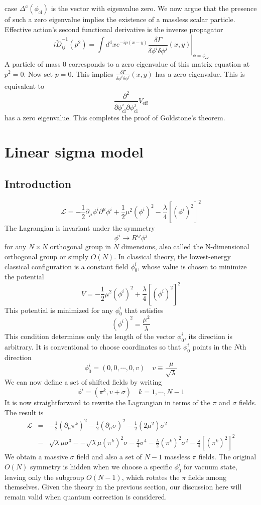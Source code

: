 \documentclass[cyan]{elegantnote}
\begin{document}
\begin{newproof}
case $\Delta^a(\phi_{\mathrm{cl}})$ is the vector with eigenvalue zero.
We now argue that the presence of such a zero eigenvalue implies the existence of a massless scalar particle. Effective action's second functional derivative is the inverse propagator
\[i\tilde{D}_{ij}^{-1}(p^2) = \int d^4x e^{-ip(x-y)} \left. \frac{\delta \Gamma}{\delta \phi^i \delta \phi^j}(x,y) \right|_{\phi = \phi_{\mathcal{cl}}}\]
A particle of mass $0$ corresponds to a zero eigenvalue of this matrix equation at $p^2 = 0$. Now set $p=0$. This implies $\frac{\delta \Gamma}{\delta \phi^i \delta \phi^j}(x,y)$ has a zero eigenvalue. This is equivalent to 
\[\frac{\partial^2}{\partial \phi^i_{\mathrm{cl}} \partial \phi^j_{\mathrm{cl}}}V_{\mathrm{eff}}\]
has a zero eigenvalue. This completes the proof of Goldstone's theorem.
\end{newproof}

\section{Linear sigma model}
\subsection{Introduction}
\[\mathcal{L} = -\frac{1}{2} \partial_{\mu} \phi^i \partial^{\mu}\phi^i + \frac{1}{2} \mu^2 (\phi^i)^2 - \frac{\lambda}{4} [(\phi^i)^2]^2\]
The Lagrangian is invariant under the symmetry
\[\phi^i \to R^{ij} \phi^j\]
for any $N \times N$ orthogonal group in $N$ dimensions, also called the N-dimensional orthogonal group or simply $O(N)$. In classical theory, the lowest-energy classical configuration is a constant field $\phi_0^i$, whose value is chosen to minimize the potential
\[V = -\frac{1}{2}\mu^2 (\phi^i)^2 + \frac{\lambda}{4}[(\phi^i)^2]^2\]
This potential is minimized for any $\phi_0^i$ that satisfies
\[(\phi^i)^2 = \frac{\mu^2}{\lambda} \]
This condition determines only the length of the vector $\phi_0^i$, its direction is arbitrary. 
It is conventional to choose coordinates so that $\phi_0^i$ points in the $N$th direction
\[\phi_0^i = (0,0,\cdots,0,v) \quad v \equiv \frac{\mu}{\sqrt{\lambda}}\]
We can now define a set of shifted fields by writing
\[\phi^i = (\pi^k,v+\sigma) \quad k = 1,\cdots,N-1\]
It is now straightforward to rewrite the Lagrangian in terms of the $\pi$ and $\sigma$ fields. The result is
\begin{eqnarray}
\mathcal{L} &=& -\frac{1}{2}(\partial_{\mu}\pi^k)^2 - \frac{1}{2}(\partial_{\mu}\sigma)^2 - \frac{1}{2}(2\mu^2)\sigma^2 \nonumber \\
&-& \sqrt{\lambda}\mu \sigma^3 - -\sqrt{\lambda}\mu (\pi^k)^2\sigma - \frac{\lambda}{4}\sigma^4 - \frac{\lambda}{2}(\pi^k)^2\sigma^2 - \frac{\lambda}{4}[(\pi^k)^2]^2 \nonumber
\end{eqnarray}
We obtain a massive $\sigma$ field and also a set of $N-1$ massless $\pi$ fields. The original $O(N)$ symmetry is hidden when we choose a specific $\phi_0^i$ for vacuum state, leaving only the subgroup $O(N-1)$, which rotates the $\pi$ fields among themselves. Given the theory in the previous section, our discussion here will remain valid when quantum correction is considered.
\end{document}
